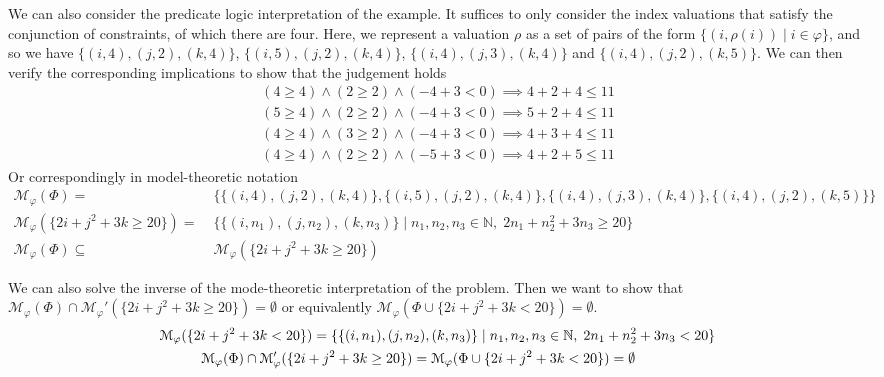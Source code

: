 \begin{example}
    We can also consider the predicate logic interpretation of the example. It suffices to only consider the index valuations that satisfy the conjunction of constraints, of which there are four. Here, we represent a valuation $\rho$ as a set of pairs of the form $\{(i,\rho(i)) \mid i\in\varphi\}$, and so we have $\{(i,4),(j,2),(k,4)\}$, $\{(i,5),(j,2),(k,4)\}$, $\{(i,4),(j,3),(k,4)\}$ and $\{(i,4),(j,2),(k,5)\}$. We can then verify the corresponding implications to show that the judgement holds
    \begin{align*}
        (4 \geq 4) \land (2 \geq 2) \land ({-4}+3 < 0) \implies 4+2+4 \leq 11\\
        (5 \geq 4) \land (2 \geq 2) \land ({-4}+3 < 0) \implies 5+2+4 \leq 11\\
        (4 \geq 4) \land (3 \geq 2) \land ({-4}+3 < 0) \implies 4+3+4 \leq 11\\
        (4 \geq 4) \land (2 \geq 2) \land ({-5}+3 < 0) \implies 4+2+5 \leq 11
    \end{align*}
    Or correspondingly in model-theoretic notation
    {\small
    \begin{align*}
        \mathcal{M}_\varphi(\Phi) =&\; \{\{(i,4),(j,2),(k,4)\}, \{(i,5),(j,2),(k,4)\}, \{(i,4),(j,3),(k,4)\}, \{(i,4),(j,2),(k,5)\}\}\\
        \mathcal{M}_\varphi(\{2i+j^2+3k\geq 20\}) =&\; \{\{(i,n_1),(j,n_2),(k,n_3)\} \mid n_1,n_2,n_3\in\mathbb{N},\; 2n_1 + n_2^2 + 3n_3 \geq 20 \}\\
        \mathcal{M}_\varphi(\Phi) \subseteq&\; \mathcal{M}_\varphi(\{2i+j^2+3k\geq 20\})
    \end{align*}}
    
    We can also solve the inverse of the mode-theoretic interpretation of the problem. Then we want to show that $\mathcal{M}_\varphi(\Phi) \cap \mathcal{M}_\varphi'(\{2i+j^2+3k\geq 20\}) = \emptyset$ or equivalently $\mathcal{M}_\varphi(\Phi \cup \{2i+j^2+3k < 20\}) = \emptyset$. 
    \begin{align*}
        \mathcal{M}_\varphi(\{2i+j^2+3k < 20\}) =&\; \{\{(i,n_1),(j,n_2),(k,n_3)\} \mid n_1,n_2,n_3\in\mathbb{N},\; 2n_1 + n_2^2 + 3n_3 < 20 \}\\
        &\kern-9em\mathcal{M}_\varphi(\Phi) \cap \mathcal{M}_\varphi'(\{2i+j^2+3k\geq 20\}) = \mathcal{M}_\varphi(\Phi \cup \{2i+j^2+3k < 20\}) = \emptyset
    \end{align*}
  \end{example}
  
